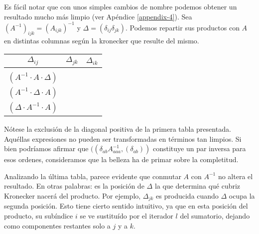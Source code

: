 \vspace{0.5cm}

Es fácil notar que con unos simples cambios de nombre podemos obtener un resultado mucho más limpio (ver Apéndice \ref{appendix-4}). Sea $(A^{-1})_{ijk} = (A_{ijk})^{-1}$ y $\Delta = (\delta_{ij}\delta_{jk})$. Podemos repartir sus productos con $A$ en distintas columnas según la kronecker que resulte del mismo.

\vspace{0.5cm}
\begin{tabular}{ |c|c|c| } 
	\hline
	$\Delta_{ij}$ & $\Delta_{jk}$ & $\Delta_{ik}$ \\
	\hline
	\makecell{$(A \cdot A^{-1} \cdot \Delta)$ \\ $(A^{-1} \cdot A \cdot \Delta)$} &
	\makecell{$(A \cdot \Delta \cdot A^{-1})$ \\ $(A^{-1} \cdot \Delta \cdot A)$} &
	\makecell{$(\Delta \cdot A \cdot A^{-1})$ \\ $(\Delta \cdot A^{-1} \cdot A)$} \\
	\hline
\end{tabular}
\vspace{0.5cm}

Nótese la exclusión de la diagonal positiva de la primera tabla presentada. Aquéllas expresiones no pueden ser transformadas en términos tan limpios. Si bien podríamos afirmar que $((\delta_{ab} A^{-1}_{aaa}, (\delta_{ab}))$ constituye un par inversa para esos ordenes, consideramos que la belleza ha de primar sobre la completitud.

Analizando la última tabla, parece evidente que conmutar $A$ con $A^{-1}$ no altera el resultado. En otras palabras: es la posición de $\Delta$ la que determina qué cubriz Kronecker nacerá del producto. Por ejemplo, $\Delta_{jk}$ es producida cuando $\Delta$ ocupa la segunda posición. Esto tiene cierto sentido intuitivo, ya que en esta posición del producto, su subíndice $i$ se ve sustituído por el iterador $l$ del sumatorio, dejando como componentes restantes solo a $j$ y a $k$.

\newpage
